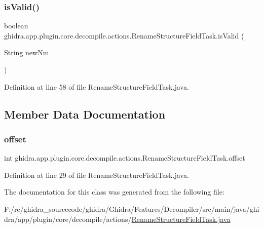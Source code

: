 \subsubsection{\texorpdfstring{isValid()}{isValid()}}
{\footnotesize\ttfamily boolean ghidra.\+app.\+plugin.\+core.\+decompile.\+actions.\+Rename\+Structure\+Field\+Task.\+is\+Valid (\begin{DoxyParamCaption}\item[{String}]{new\+Nm }\end{DoxyParamCaption})\hspace{0.3cm}{\ttfamily [inline]}}



Definition at line 58 of file Rename\+Structure\+Field\+Task.\+java.



\subsection{Member Data Documentation}
\mbox{\label{classghidra_1_1app_1_1plugin_1_1core_1_1decompile_1_1actions_1_1_rename_structure_field_task_a519575d0203f600bad15c05880fb3353}} 
\subsubsection{\texorpdfstring{offset}{offset}}
{\footnotesize\ttfamily int ghidra.\+app.\+plugin.\+core.\+decompile.\+actions.\+Rename\+Structure\+Field\+Task.\+offset}



Definition at line 29 of file Rename\+Structure\+Field\+Task.\+java.



The documentation for this class was generated from the following file\+:\begin{DoxyCompactItemize}
\item 
F\+:/re/ghidra\+\_\+sourcecode/ghidra/\+Ghidra/\+Features/\+Decompiler/src/main/java/ghidra/app/plugin/core/decompile/actions/\mbox{\hyperlink{_rename_structure_field_task_8java}{Rename\+Structure\+Field\+Task.\+java}}\end{DoxyCompactItemize}
